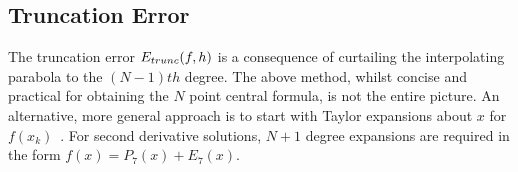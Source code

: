%

\subsection{Truncation Error}\label{sec:truncerr}

The truncation error $\cramped{E_{trunc}(f,h)}$ is a consequence of curtailing the interpolating parabola to the $(N-1)th$ degree.
The above method, whilst concise and practical for obtaining the $N$ point central formula, is not the entire picture.
An alternative, more general approach is to start with Taylor expansions about $x$ for $f(x_k)$~\cite{Cyrus1968,Mathews2004}.
For second derivative solutions, $N+1$ degree expansions are required in the form $f(x) = P_7(x)+E_7(x)$.

